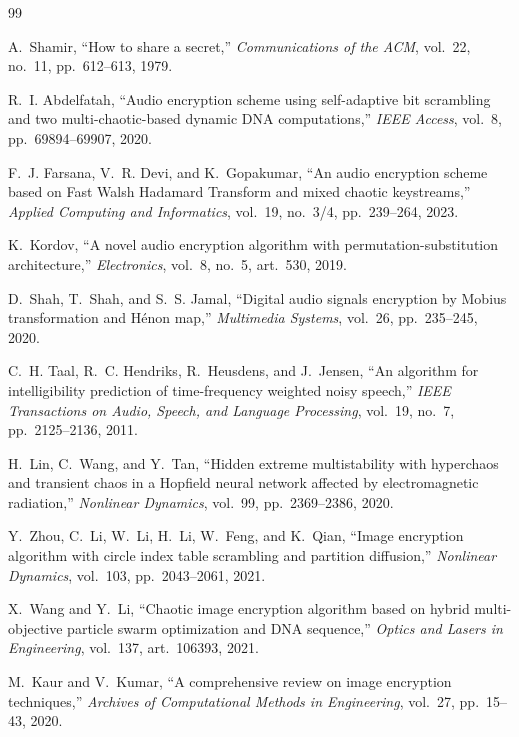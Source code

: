 \documentclass[pdflatex,sn-mathphys-num]{sn-jnl}%
\theoremstyle{thmstyleone}%
\theoremstyle{thmstyletwo}%
\theoremstyle{thmstylethree}%
\begin{document}
\begin{thebibliography}{99}
\small

 A.~Shamir, ``How to share a secret,'' \textit{Communications of the ACM}, vol.~22, no.~11, pp.~612--613, 1979.

 R.~I. Abdelfatah, ``Audio encryption scheme using self-adaptive bit scrambling and two multi-chaotic-based dynamic DNA computations,'' \textit{IEEE Access}, vol.~8, pp.~69894--69907, 2020.

 F.~J. Farsana, V.~R. Devi, and K.~Gopakumar, ``An audio encryption scheme based on Fast Walsh Hadamard Transform and mixed chaotic keystreams,'' \textit{Applied Computing and Informatics}, vol.~19, no.~3/4, pp.~239--264, 2023.

 K.~Kordov, ``A novel audio encryption algorithm with permutation-substitution architecture,'' \textit{Electronics}, vol.~8, no.~5, art.~530, 2019.

 D.~Shah, T.~Shah, and S.~S. Jamal, ``Digital audio signals encryption by Mobius transformation and H\'enon map,'' \textit{Multimedia Systems}, vol.~26, pp.~235--245, 2020.

 C.~H. Taal, R.~C. Hendriks, R.~Heusdens, and J.~Jensen, ``An algorithm for intelligibility prediction of time-frequency weighted noisy speech,'' \textit{IEEE Transactions on Audio, Speech, and Language Processing}, vol.~19, no.~7, pp.~2125--2136, 2011.

 H.~Lin, C.~Wang, and Y.~Tan, ``Hidden extreme multistability with hyperchaos and transient chaos in a Hopfield neural network affected by electromagnetic radiation,'' \textit{Nonlinear Dynamics}, vol.~99, pp.~2369--2386, 2020.

 Y.~Zhou, C.~Li, W.~Li, H.~Li, W.~Feng, and K.~Qian, ``Image encryption algorithm with circle index table scrambling and partition diffusion,'' \textit{Nonlinear Dynamics}, vol.~103, pp.~2043--2061, 2021.

 X.~Wang and Y.~Li, ``Chaotic image encryption algorithm based on hybrid multi-objective particle swarm optimization and DNA sequence,'' \textit{Optics and Lasers in Engineering}, vol.~137, art.~106393, 2021.

 M.~Kaur and V.~Kumar, ``A comprehensive review on image encryption techniques,'' \textit{Archives of Computational Methods in Engineering}, vol.~27, pp.~15--43, 2020.


\end{thebibliography}
\end{document}

